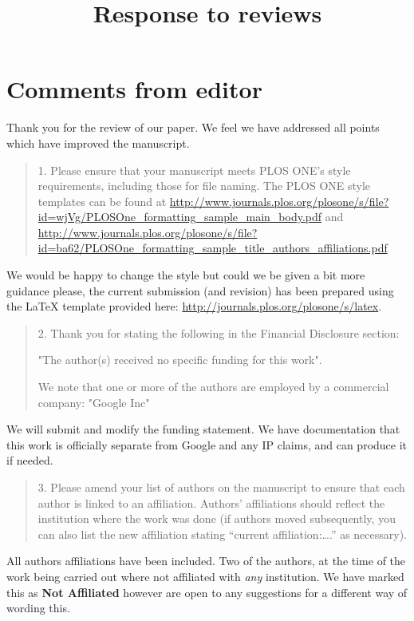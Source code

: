 \documentclass[a4]{article}
\title{Response to reviews}
\begin{document}
\maketitle

\section{Comments from editor}

Thank you for the review of our paper. We feel we have addressed all points
which have improved the manuscript.

\begin{quote}
	1. Please ensure that your manuscript meets PLOS ONE's style requirements,
	including those for file naming. The PLOS ONE style templates can be found at
	\url{http://www.journals.plos.org/plosone/s/file?id=wjVg/PLOSOne_formatting_sample_main_body.pdf}
	and
	\url{http://www.journals.plos.org/plosone/s/file?id=ba62/PLOSOne_formatting_sample_title_authors_affiliations.pdf}
\end{quote}

We would be happy to change the style but could we be given a bit more guidance
please, the current submission (and revision) has been prepared using the LaTeX
template provided here: \url{http://journals.plos.org/plosone/s/latex}.

\begin{quote}
	2. Thank you for stating the following in the Financial Disclosure section:

	"The author(s) received no specific funding for this work".

	We note that one or more of the authors are employed by a commercial company: "Google Inc"
\end{quote}

We will submit and modify the funding statement.
We have documentation that this work is officially separate from Google and
any IP claims, and can produce it if needed.

\begin{quote}
3. Please amend your list of authors on the manuscript to ensure that each
author is linked to an affiliation. Authors’ affiliations should reflect the
institution where the work was done (if authors moved subsequently, you can
also list the new affiliation stating “current affiliation:….” as necessary).
\end{quote}

All authors affiliations have been included. Two of the authors, at the time of
the work being carried out where not affiliated with \textit{any} institution.
We have marked this as \textbf{Not Affiliated} however are open to any
suggestions for a different way of wording this.
\end{document}
